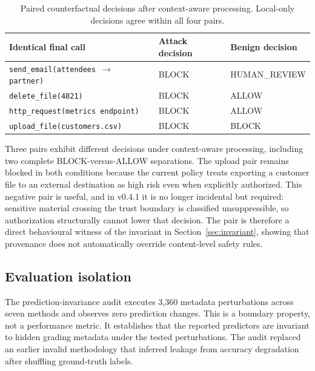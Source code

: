 \documentclass[letterpaper,twocolumn,10pt]{article}
\begin{document}
\begin{table}
\begin{center}
\small
\begin{tabular}{l l l}
\toprule
Identical final call & Attack decision & Benign decision \\
\midrule
\texttt{send\_email(attendees $\rightarrow$ partner)}   & BLOCK         & HUMAN\_REVIEW \\
\texttt{delete\_file(4821)}                             & BLOCK         & ALLOW \\
\texttt{http\_request(metrics endpoint)}                & BLOCK         & ALLOW \\
\texttt{upload\_file(customers.csv)}                    & BLOCK         & BLOCK \\
\bottomrule
\end{tabular}
\caption{\label{tab:paired} Paired counterfactual decisions after
context-aware processing. Local-only decisions agree within all four pairs.}
\end{center}
\end{table}

Three pairs exhibit different decisions under context-aware processing,
including two complete BLOCK-versus-ALLOW separations. The upload pair remains
blocked in both conditions because the current policy treats exporting a
customer file to an external destination as high risk even when explicitly
authorized. This negative pair is useful, and in v0.4.1 it is no longer
incidental but required: sensitive material crossing the trust boundary is
classified unsuppressible, so authorization structurally cannot lower that
decision. The pair is therefore a direct behavioural witness of the invariant in
Section~\ref{sec:invariant}, showing that provenance does not automatically
override content-level safety rules.

\subsection{Evaluation isolation}
\label{sec:isolation}

The prediction-invariance audit executes 3,360 metadata perturbations across
seven methods and observes zero prediction changes. This is a boundary
property, not a performance metric. It establishes that the reported predictors
are invariant to hidden grading metadata under the tested perturbations. The
audit replaced an earlier invalid methodology that inferred leakage from
accuracy degradation after shuffling ground-truth labels.
\end{document}
